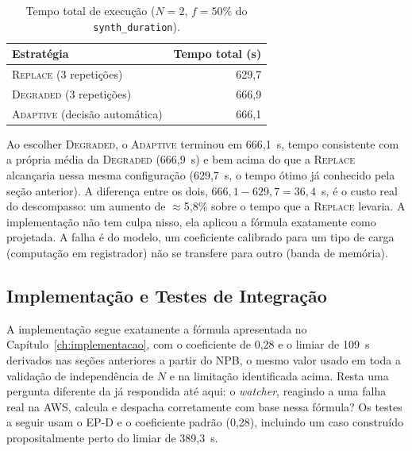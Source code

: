 \begin{table}[htb]
  \caption{Tempo total de execução ($N=2$, $f=50\%$ do \texttt{synth\_duration}).}
  \label{tab:adaptive-descompasso}
  \centering
  \small
  \begin{tabular}{l r}
    \toprule
    Estratégia & Tempo total (s) \\
    \midrule
    \textsc{Replace} (3 repetições)             & 629,7 \\
    \textsc{Degraded} (3 repetições)             & 666,9 \\
    \textsc{Adaptive} (decisão automática)       & 666,1 \\
    \bottomrule
  \end{tabular}
\end{table}

Ao escolher \textsc{Degraded}, o \textsc{Adaptive} terminou em 666,1~s, tempo
consistente com a própria média da \textsc{Degraded} (666,9~s) e bem acima do que a
\textsc{Replace} alcançaria nessa mesma configuração (629,7~s, o tempo ótimo já
conhecido pela seção anterior). A diferença entre os dois, $666,1 - 629,7 =
36,4$~s, é o custo real do descompasso: um aumento de $\approx$5,8\% sobre o tempo
que a \textsc{Replace} levaria. A implementação não tem culpa nisso, ela aplicou a
fórmula exatamente como projetada. A falha é do modelo, um coeficiente calibrado
para um tipo de carga (computação em registrador) não se transfere para outro
(banda de memória).

\subsection{Implementação e Testes de Integração}
\label{sec:adaptive-implementacao}

A implementação segue exatamente a fórmula apresentada no
Capítulo~\ref{ch:implementacao}, com o coeficiente de 0,28 e o limiar de 109~s
derivados nas seções anteriores a partir do NPB, o mesmo valor usado em toda a
validação de independência de $N$ e na limitação identificada acima. Resta uma
pergunta
diferente da já respondida até aqui: o \textit{watcher}, reagindo a uma falha real
na AWS, calcula e despacha corretamente com base nessa fórmula? Os testes a seguir
usam o EP-D e o coeficiente padrão (0,28), incluindo um caso construído
propositalmente perto do limiar de 389,3~s.


